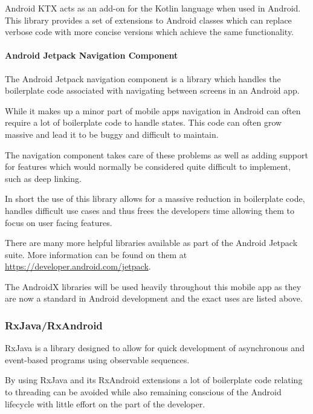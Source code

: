 Android KTX acts as an add-on for the Kotlin language when used in Android. This library provides a set of extensions to Android classes which can replace verbose code with more concise versions which achieve the same functionality\cite{androidktx}.

\paragraph{Android Jetpack Navigation Component}

The Android Jetpack navigation component is a library which handles the boilerplate code associated with navigating between screens in an Android app.

While it makes up a minor part of mobile apps navigation in Android can often require a lot of boilerplate code to handle states. This code can often grow massive and lead it to be buggy and difficult to maintain.

The navigation component takes care of these problems as well as adding support for features which would normally be considered quite difficult to implement, such as deep linking.

In short the use of this library allows for a massive reduction in boilerplate code, handles difficult use cases and thus frees the developers time allowing them to focus on user facing features\cite{androidjetpacknavigation}.

There are many more helpful libraries available as part of the Android Jetpack suite. More information can be found on them at \url{https://developer.android.com/jetpack}.

The AndroidX libraries will be used heavily throughout this mobile app as they are now a standard in Android development and the exact uses are listed above.

\subsubsection{RxJava/RxAndroid}

RxJava is a library designed to allow for quick development of asynchronous and event-based programs using observable sequences\cite{rxjava}.


By using RxJava and its RxAndroid extensions a lot of boilerplate code relating to threading can be avoided while also remaining conscious of the Android lifecycle with little effort on the part of the developer. 

